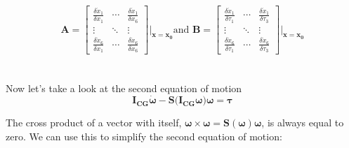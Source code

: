 \begin{equation*}
    \mathbf{A} =
    \begin{bmatrix}
        \frac{\delta\dot{x}_1}{\delta x_1}  &   \cdots  &   \frac{\delta\dot{x}_1}{\delta x_6}\\
        \vdots                              &   \ddots  &   \vdots\\
        \frac{\delta\dot{x}_6}{\delta x_1}  &   \cdots  &   \frac{\delta\dot{x}_6}{\delta x_6}
    \end{bmatrix}\Biggr|_{\mathbf{x=x_0}}
    \text{and  }
    \mathbf{B} =
    \begin{bmatrix}
        \frac{\delta\dot{x}_1}{\delta \tau_1}  &   \cdots  &   \frac{\delta\dot{x}_1}{\delta\tau_3}\\
        \vdots                              &   \ddots  &   \vdots\\
        \frac{\delta\dot{x}_6}{\delta \tau_1}  &   \cdots  &   \frac{\delta\dot{x}_6}{\delta \tau_3}
    \end{bmatrix}\Biggr|_{\mathbf{x=x_0}}
\end{equation*} \\ \\
Now let's take a look at the second equation of motion
\begin{equation*}
    \mathbf{I_{CG}}\dot{\boldsymbol{\omega}} - \mathbf{S(I_{CG}}\boldsymbol{\omega})\boldsymbol{\omega} = \boldsymbol{\tau}
\end{equation*}

The cross product of a vector with itself, $\boldsymbol{\omega}\times\boldsymbol{\omega} = \mathbf{S}(\boldsymbol{\omega})\boldsymbol{\omega}$, is always equal to zero. We can use this to simplify the second equation of motion:

